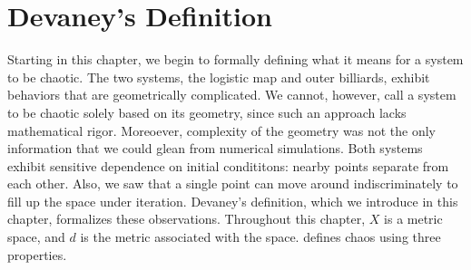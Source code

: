 \documentclass[10pt,draft,twoside]{book}
\begin{document}
\chapter{Devaney's Definition}
\label{chap:devaney}
Starting in this chapter, we begin to formally defining what it means for a system to be chaotic.
The two systems, the logistic map and outer billiards, exhibit behaviors that are geometrically complicated.
We cannot, however, call a system to be chaotic solely based on its geometry, since such an approach lacks mathematical rigor.
Moreoever, complexity of the geometry was not the only information that we could glean from numerical simulations.
Both systems exhibit sensitive dependence on initial condititons: nearby points separate from each other.
Also, we saw that a single point can move around indiscriminately to fill up the space under iteration.
Devaney's definition, which we introduce in this chapter, formalizes these observations.
Throughout this chapter, $X$ is a metric space, and $d$ is the metric associated with the space.
\citet{devaney} defines chaos using three properties.

\end{document}
